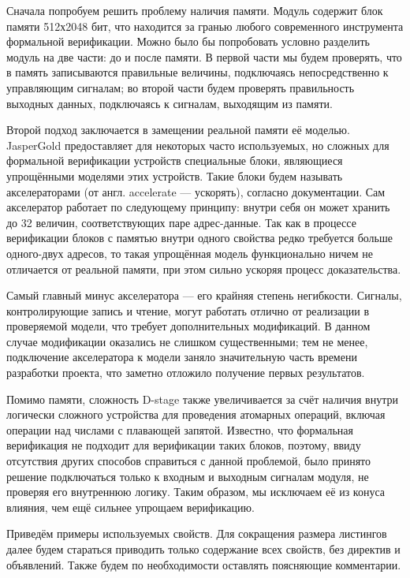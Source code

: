 Сначала попробуем решить проблему наличия памяти. Модуль содержит блок памяти 512х2048 бит, что находится за гранью любого современного инструмента формальной верификации. Можно было бы попробовать условно разделить модуль на две части: до и после памяти. В первой части мы будем проверять, что в память записываются правильные величины, подключаясь непосредственно к управляющим сигналам; во второй части будем проверять правильность выходных данных, подключаясь к сигналам, выходящим из памяти. 

Второй подход заключается в замещении реальной памяти её моделью. JasperGold предоставляет для некоторых часто используемых, но сложных для формальной верификации устройств специальные блоки, являющиеся упрощёнными моделями этих устройств. Такие блоки будем называть акселераторами (от англ. accelerate --- ускорять), согласно документации. Сам акселератор работает по следующему принципу: внутри себя он может хранить до 32 величин, соответствующих паре адрес-данные. Так как в процессе верификации блоков с памятью внутри одного свойства редко требуется больше одного-двух адресов, то такая упрощённая модель функционально ничем не отличается от реальной памяти, при этом сильно ускоряя процесс доказательства.

Самый главный минус акселератора --- его крайняя степень негибкости. Сигналы, контролирующие запись и чтение, могут работать отлично от реализации в проверяемой модели, что требует дополнительных модификаций. В данном случае модификации оказались не слишком существенными; тем не менее, подключение акселератора к модели заняло значительную часть времени разработки проекта, что заметно отложило получение первых результатов. 

Помимо памяти, сложность D-stage также увеличивается за счёт наличия внутри логически сложного устройства для проведения атомарных операций, включая операции над числами с плавающей запятой. Известно, что формальная верификация не подходит для верификации таких блоков, поэтому, ввиду отсутствия других способов справиться с данной проблемой, было принято решение подключаться только к входным и выходным сигналам модуля, не проверяя его внутреннюю логику. Таким образом, мы исключаем её из конуса влияния, чем ещё сильнее упрощаем верификацию.

Приведём примеры используемых свойств. Для сокращения размера листингов далее будем стараться приводить только содержание всех свойств, без директив и объявлений. Также будем по необходимости оставлять поясняющие комментарии. 

